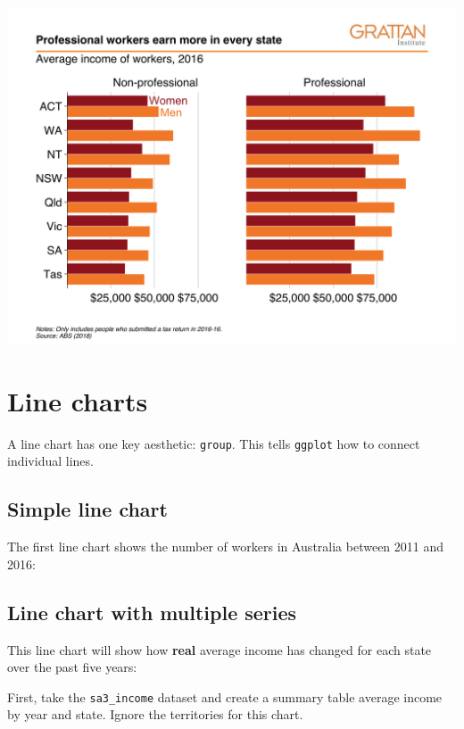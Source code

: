 \documentclass[]{book}
\begin{document}
\includegraphics[width=44.44in]{atlas/facet_bar}

\hypertarget{line-charts}{%
\section{Line charts}\label{line-charts}}

A line chart has one key aesthetic: \texttt{group}. This tells \texttt{ggplot} how to connect individual lines.

\hypertarget{simple-line-chart}{%
\subsection{Simple line chart}\label{simple-line-chart}}

The first line chart shows the number of workers in Australia between 2011 and 2016:

\hypertarget{line-chart-with-multiple-series}{%
\subsection{Line chart with multiple series}\label{line-chart-with-multiple-series}}

This line chart will show how \textbf{real} average income has changed for each state over the past five years:

First, take the \texttt{sa3\_income} dataset and create a summary table average income by year and state. Ignore the territories for this chart.
\end{document}
